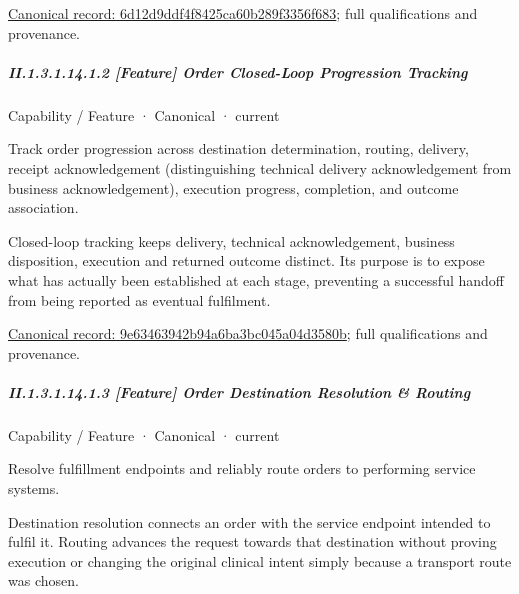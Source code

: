 {\footnotesize \href{../../../../../../../continuum/strategy/capability/feature/6d12d9ddf4f8425ca60b289f3356f683.md}{Canonical record: 6d12d9ddf4f8425ca60b289f3356f683}; full qualifications and provenance.}\par
\subparagraph*{II.1.3.1.14.1.2 [Feature] Order Closed-Loop Progression Tracking}
\label{navigation:II.1.3.1.14.1.2}

\label{element:9e63463942b94a6ba3bc045a04d3580b}
{\small Capability / Feature · Canonical · current}\par

Track order progression across destination determination, routing, delivery, receipt acknowledgement (distinguishing technical delivery acknowledgement from business acknowledgement), execution progress, completion, and outcome association.



Closed-loop tracking keeps delivery, technical acknowledgement, business disposition, execution and returned outcome distinct. Its purpose is to expose what has actually been established at each stage, preventing a successful handoff from being reported as eventual fulfilment.


{\footnotesize \href{../../../../../../../continuum/strategy/capability/feature/9e63463942b94a6ba3bc045a04d3580b.md}{Canonical record: 9e63463942b94a6ba3bc045a04d3580b}; full qualifications and provenance.}\par
\subparagraph*{II.1.3.1.14.1.3 [Feature] Order Destination Resolution \& Routing}
\label{navigation:II.1.3.1.14.1.3}

\label{element:9f8f1542efc64e89ad226689291f2635}
{\small Capability / Feature · Canonical · current}\par

Resolve fulfillment endpoints and reliably route orders to performing service systems.



Destination resolution connects an order with the service endpoint intended to fulfil it. Routing advances the request towards that destination without proving execution or changing the original clinical intent simply because a transport route was chosen.


